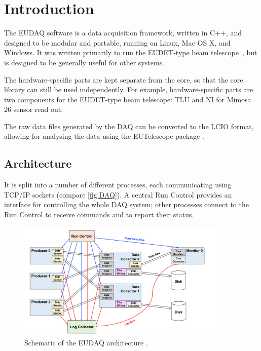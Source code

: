 \section{Introduction}
The EUDAQ software is a data acquisition framework, written in C++,
and designed to be modular and portable, running on Linux, Mac OS X, and Windows.
It was written primarily to run the EUDET-type beam telescope~\cite{Roloff:2009zza,Jansen:2016},
but is designed to be generally useful for other systems.

The hardware-specific parts are kept separate from the core,
so that the core library can still be used independently.
For example, hardware-specific parts are two components for the EUDET-type beam telescope: \gls{TLU} and \gls{NI} for Mimosa 26 sensor read out.

The raw data files generated by the DAQ can be converted to the \gls{LCIO} format,
allowing for analysing the data using the EUTelescope package \cite{eutel2008}.

\subsection{Architecture}
It is split into a number of different processes,
each communicating using TCP/IP sockets (compare \autoref{fig:DAQ}).
A central Run Control provides an interface for controlling the whole DAQ system;
other processes connect to the Run Control to receive commands and to report their status.

\begin{figure}[htb]
  \begin{center}
    \includegraphics[width=0.9\textwidth]{src/images/eudaq_working_principle}
    \caption{Schematic of the EUDAQ architecture \cite{Spannagel:2017}.}
    \label{fig:DAQ}
  \end{center}
\end{figure}

